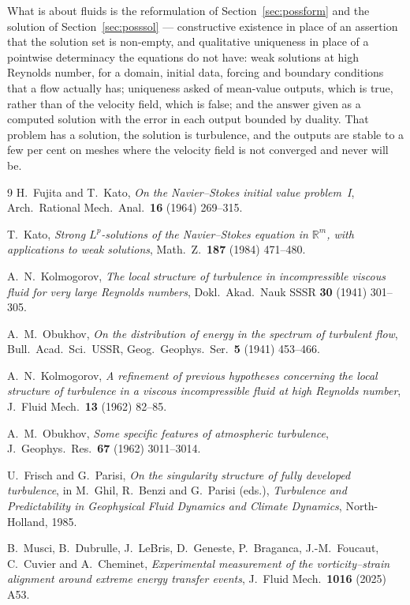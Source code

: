 \documentclass[11pt]{article}
\begin{document}
What is about fluids is the reformulation of Section~\ref{sec:possform} and the solution of
Section~\ref{sec:posssol} --- constructive existence in place of an assertion that the solution set
is non-empty, and qualitative uniqueness in place of a pointwise determinacy the equations do not
have: weak solutions at high Reynolds number, for a domain, initial data,
forcing and boundary conditions that a flow actually has; uniqueness asked of mean-value outputs,
which is true, rather than of the velocity field, which is false; and the answer given as a computed
solution with the error in each output bounded by duality. That problem has a solution, the solution
is turbulence, and the outputs are stable to a few per cent on meshes where the velocity field is
not converged and never will be.

\begin{thebibliography}{9}
 H.~Fujita and T.~Kato, \emph{On the Navier--Stokes initial value problem~I},
Arch.\ Rational Mech.\ Anal.\ \textbf{16} (1964) 269--315.

 T.~Kato, \emph{Strong $L^p$-solutions of the Navier--Stokes equation in
$\mathbb{R}^m$, with applications to weak solutions}, Math.\ Z.\ \textbf{187} (1984) 471--480.

 A.~N.~Kolmogorov, \emph{The local structure of turbulence in incompressible
viscous fluid for very large Reynolds numbers}, Dokl.\ Akad.\ Nauk SSSR \textbf{30} (1941) 301--305.

 A.~M.~Obukhov, \emph{On the distribution of energy in the spectrum of turbulent
flow}, Bull.\ Acad.\ Sci.\ USSR, Geog.\ Geophys.\ Ser.\ \textbf{5} (1941) 453--466.

 A.~N.~Kolmogorov, \emph{A refinement of previous hypotheses concerning the
local structure of turbulence in a viscous incompressible fluid at high Reynolds number}, J.\ Fluid
Mech.\ \textbf{13} (1962) 82--85.

 A.~M.~Obukhov, \emph{Some specific features of atmospheric turbulence}, J.\
Geophys.\ Res.\ \textbf{67} (1962) 3011--3014.

 U.~Frisch and G.~Parisi, \emph{On the singularity structure of fully developed
turbulence}, in M.~Ghil, R.~Benzi and G.~Parisi (eds.), \emph{Turbulence and Predictability in
Geophysical Fluid Dynamics and Climate Dynamics}, North-Holland, 1985.

 B.~Musci, B.~Dubrulle, J.~LeBris, D.~Geneste, P.~Braganca, J.-M.~Foucaut, C.~Cuvier
and A.~Cheminet, \emph{Experimental measurement of the vorticity--strain alignment around extreme
energy transfer events}, J.\ Fluid Mech.\ \textbf{1016} (2025) A53.


\end{thebibliography}
\end{document}
